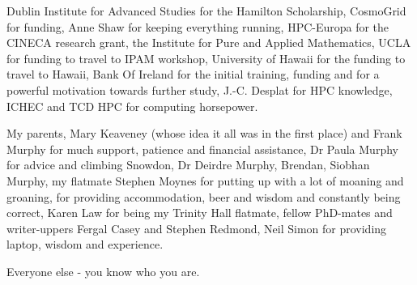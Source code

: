 Dublin Institute for Advanced Studies for the Hamilton Scholarship,
CosmoGrid for funding,
Anne Shaw for keeping everything running,
HPC-Europa for the CINECA research grant,
the Institute for Pure and Applied Mathematics, UCLA for funding to travel to IPAM workshop,
University of Hawaii for the funding to travel to Hawaii,
Bank Of Ireland for the initial training, funding and for a powerful motivation towards further study,
J.-C. Desplat for HPC knowledge,
ICHEC and TCD HPC for computing horsepower.

My parents, Mary Keaveney (whose idea it all was in the first place) and Frank Murphy for much support, patience and financial assistance, 
Dr Paula Murphy for advice and climbing Snowdon,
Dr Deirdre Murphy, Brendan, Siobhan Murphy,
my flatmate Stephen Moynes for putting up with a lot of moaning and groaning, for providing accommodation, beer and wisdom and constantly being correct,
Karen Law for being my Trinity Hall flatmate,
fellow PhD-mates and writer-uppers Fergal Casey and Stephen Redmond,
Neil Simon for providing laptop, wisdom and experience.

Everyone else - you know who you are.
